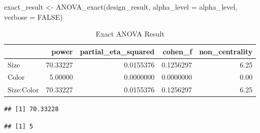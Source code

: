 \documentclass[
]{book}
\newenvironment{Shaded}{\begin{snugshade}}{\end{snugshade}}
\newcommand{\AttributeTok}[1]{\textcolor[rgb]{0.77,0.63,0.00}{#1}}
\newcommand{\CommentTok}[1]{\textcolor[rgb]{0.56,0.35,0.01}{\textit{#1}}}
\newcommand{\ConstantTok}[1]{\textcolor[rgb]{0.00,0.00,0.00}{#1}}
\newcommand{\FunctionTok}[1]{\textcolor[rgb]{0.00,0.00,0.00}{#1}}
\newcommand{\NormalTok}[1]{#1}
\newcommand{\OtherTok}[1]{\textcolor[rgb]{0.56,0.35,0.01}{#1}}
\newcommand{\SpecialCharTok}[1]{\textcolor[rgb]{0.00,0.00,0.00}{#1}}
\begin{document}
\begin{Shaded}
\begin{Highlighting}[]
\NormalTok{exact\_result }\OtherTok{\textless{}{-}} \FunctionTok{ANOVA\_exact}\NormalTok{(design\_result,}
                            \AttributeTok{alpha\_level =}\NormalTok{ alpha\_level,}
                            \AttributeTok{verbose =} \ConstantTok{FALSE}\NormalTok{)}
\end{Highlighting}
\end{Shaded}

\begin{table}[!h]

\caption{\label{tab:unnamed-chunk-187}Exact ANOVA Result}
\centering
\begin{tabular}[t]{l|r|r|r|r}
\hline
  & power & partial\_eta\_squared & cohen\_f & non\_centrality\\
\hline
Size & 70.33227 & 0.0155376 & 0.1256297 & 6.25\\
\hline
Color & 5.00000 & 0.0000000 & 0.0000000 & 0.00\\
\hline
Size:Color & 70.33227 & 0.0155376 & 0.1256297 & 6.25\\
\hline
\end{tabular}
\end{table}

\begin{Shaded}
\end{Shaded}

\begin{verbatim}
## [1] 70.33228
\end{verbatim}

\begin{Shaded}
\end{Shaded}

\begin{verbatim}
## [1] 5
\end{verbatim}

\begin{Shaded}
\end{Shaded}
\end{document}

